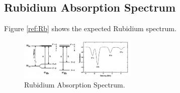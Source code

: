 \subsection{Rubidium Absorption Spectrum}
\label{sec:Rubidium Absorption Spectrum}

Figure \ref{ref:Rb} shows the expected Rubidium spectrum.

\begin{figure}[H]
    \centering
    \includegraphics[width=0.5\textwidth]{content/graphics/Rb.jpg}
    \caption{Rubidium Absorption Spectrum.\cite{diode_laser}} %
    \label{fig:Rb} 
\end{figure}